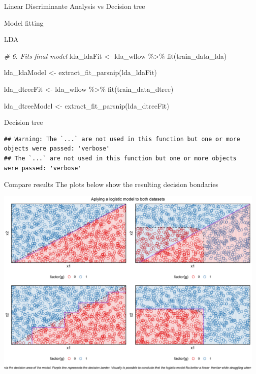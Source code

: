 \documentclass[
  ignorenonframetext,
]{article}
\newenvironment{Shaded}{\begin{snugshade}}{\end{snugshade}}
\newcommand{\CommentTok}[1]{\textcolor[rgb]{0.56,0.35,0.01}{\textit{#1}}}
\newcommand{\FunctionTok}[1]{\textcolor[rgb]{0.00,0.00,0.00}{#1}}
\newcommand{\NormalTok}[1]{#1}
\newcommand{\OtherTok}[1]{\textcolor[rgb]{0.56,0.35,0.01}{#1}}
\newcommand{\SpecialCharTok}[1]{\textcolor[rgb]{0.00,0.00,0.00}{#1}}
\begin{document}
\begin{frame}[fragile]{Linear Discriminante Analysis vs Decision tree}
\begin{block}{Model fitting}
\begin{block}{LDA}
\begin{Shaded}
\begin{Highlighting}[]
\CommentTok{\# 6. Fits final model}
\NormalTok{lda\_ldaFit }\OtherTok{\textless{}{-}} 
\NormalTok{  lda\_wflow }\SpecialCharTok{\%\textgreater{}\%} 
  \FunctionTok{fit}\NormalTok{(train\_data\_lda)}

\NormalTok{lda\_ldaModel }\OtherTok{\textless{}{-}} \FunctionTok{extract\_fit\_parsnip}\NormalTok{(lda\_ldaFit)}

\NormalTok{lda\_dtreeFit }\OtherTok{\textless{}{-}} 
\NormalTok{  lda\_wflow }\SpecialCharTok{\%\textgreater{}\%} 
  \FunctionTok{fit}\NormalTok{(train\_data\_dtree)}

\NormalTok{lda\_dtreeModel }\OtherTok{\textless{}{-}} \FunctionTok{extract\_fit\_parsnip}\NormalTok{(lda\_dtreeFit)}
\end{Highlighting}
\end{Shaded}
\end{block}
\end{block}

\begin{block}{Decision tree}
\protect\hypertarget{decision-tree}{}
\begin{verbatim}
## Warning: The `...` are not used in this function but one or more objects were passed: 'verbose'
## The `...` are not used in this function but one or more objects were passed: 'verbose'
\end{verbatim}
\end{block}

\begin{block}{Compare results}
\protect\hypertarget{compare-results-1}{}
The plots below show the resulting decision bondaries

\begin{center}\includegraphics{_main_files/figure-beamer/unnamed-chunk-28-1} \end{center}


\end{block}
\end{frame}
\end{document}

